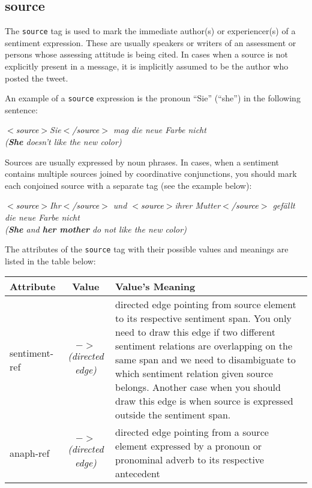 \documentclass[11pt,a4paper]{article}
\newenvironment{example}{\begin{center}\begin{exe}\ex}{\end{exe}\end{center}}
\newcommand{\xmltag}[1]{\textcolor{black}{{\small$<$#1$>$}}}
\newcommand{\source}[1]{\xmltag{source}\textcolor{orange3}{#1}\xmltag{/source}}
\renewenvironment{example}{\begin{center}\itshape}{\upshape\end{center}}
\begin{document}
\subsection{source}
The \texttt{source} tag is used to mark the immediate author(s) or
experiencer(s) of a sentiment expression.  These are usually speakers
or writers of an assessment or persons whose assessing attitude is
being cited.  In cases when a source is not explicitly present in a
message, it is implicitly assumed to be the author who posted the
tweet.

An example of a \texttt{source} expression is the pronoun ``Sie''
(``she'') in the following sentence:
\begin{example}
  \textit{\source{Sie} mag die neue Farbe
    nicht}\\ (\textit{\textbf{She} doesn't like the new color})
\end{example}
Sources are usually expressed by noun phrases.  In cases, when a
sentiment contains multiple sources joined by coordinative
conjunctions, you should mark each conjoined source with a separate
tag (see the example below):
\begin{example}
  \textit{\source{Ihr} und \source{ihrer Mutter} gef\"allt die neue
    Farbe nicht}\\ (\textit{\textbf{She} and \textbf{her mother} do not
    like the new color})
\end{example}

The attributes of the \texttt{source} tag with their possible values
and meanings are listed in the table below:\\
\begin{tabular}{|l|c|p{}|}\hline
  Attribute & Value & Value's Meaning\\\hline sentiment-ref &
  \textit{$->$\newline(directed edge)} & directed edge pointing from
  source element to its respective sentiment span.  You only need to
  draw this edge if two different sentiment relations are overlapping
  on the same span and we need to disambiguate to which sentiment
  relation given source belongs.  Another case when you should draw
  this edge is when source is expressed outside the sentiment
  span.\\\hline

  anaph-ref & \textit{$->$\newline(directed edge)} & directed edge
  pointing from a source element expressed by a pronoun or pronominal
  adverb to its respective antecedent\\\hline
\end{tabular}
\end{document}
